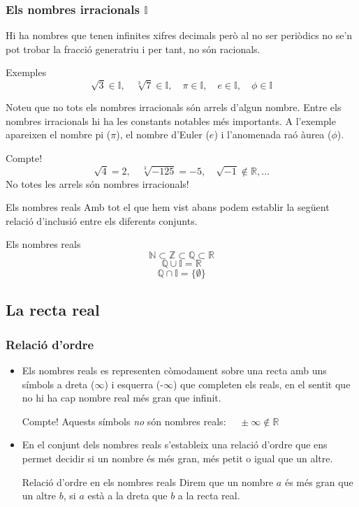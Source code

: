 \documentclass{beamer}
\begin{document}
\begin{frame}\frametitle{Els nombres irracionals $\mathbb{I}$}
Hi ha nombres que tenen infinites xifres decimals però al no ser
periòdics no se'n pot trobar la fracció generatriu i per tant, no
són racionals.\pause
\begin{exampleblock}{Exemples}
$$\sqrt{3}\in\mathbb{I},\quad \sqrt[3]{7}\in\mathbb{I},\quad \pi\in\mathbb{I},\quad
e\in\mathbb{I},\quad \phi\in\mathbb{I}$$
\end{exampleblock}\pause
Noteu que no tots els nombres irracionals són arrels d'algun
nombre. Entre els nombres irracionals hi ha les constants notables
més importants. A l'exemple apareixen el nombre pi ($\pi$), el
nombre d'Euler ($e$) i l'anomenada raó àurea ($\phi$).\pause
\begin{alertblock}{Compte!}
$$\sqrt{4}=2, \quad \sqrt[3]{-125}=-5,\quad \sqrt{-1}\notin\mathbb{R},\ldots$$ No totes les arrels són
nombres irracionals!
\end{alertblock}
\end{frame}
\begin{frame}{Els nombres reals}
Amb tot el que hem vist abans podem establir la següent relació
d'inclusió entre els diferents conjunts.
\begin{block}{Els nombres reals}
$$\mathbb{N}\subset\mathbb{Z}\subset\mathbb{Q}\subset\mathbb{R}$$
$$\mathbb{Q}\cup\mathbb{I}=\mathbb{R}$$
$$\mathbb{Q}\cap\mathbb{I}=\{\emptyset\}$$
\end{block}
\end{frame}

\subsection{La recta real}
\begin{frame}\frametitle{Relació d'ordre}
\begin{itemize}
\item
 Els nombres reals es representen còmodament sobre una recta
amb uns símbols a dreta ($\infty$) i esquerra (-$\infty$) que
completen els reals, en el sentit que no hi ha cap nombre real més
gran que infinit.\pause
\begin{alertblock}{Compte!}
Aquests símbols \emph{no} són nombres reals:
$\quad\pm\infty\notin\mathbb{R}$
\end{alertblock}\pause
\item
 En el conjunt dels nombres reals s'estableix
una relació d'ordre que ens permet decidir si un nombre és més
gran, més petit o igual que un altre.\pause
\begin{block}{Relació d'ordre en els nombres reals}
Direm que un nombre $a$ és més gran que un altre $b$, si $a$ està
a la dreta que $b$ a la recta real.
\end{block}
\end{itemize}
\end{frame}
\end{document}

